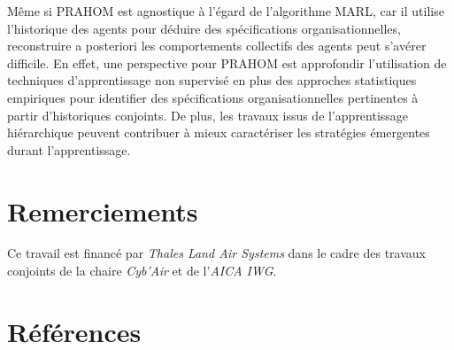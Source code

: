 \documentclass[contribution]{jfsma}
\begin{document}
Même si PRAHOM est agnostique à l'égard de l'algorithme MARL, car il utilise l'historique des agents pour déduire des spécifications organisationnelles, reconstruire a posteriori les comportements collectifs des agents peut s'avérer difficile. En effet, une perspective pour PRAHOM est approfondir l'utilisation de techniques d'apprentissage non supervisé en plus des approches statistiques empiriques pour identifier des spécifications organisationnelles pertinentes à partir d'historiques conjoints. De plus, les travaux issus de l’apprentissage hiérarchique peuvent contribuer à mieux caractériser les stratégies émergentes durant l’apprentissage.



\section*{Remerciements}

Ce travail est financé par \emph{Thales Land Air Systems} dans le cadre des travaux conjoints de la chaire \emph{Cyb'Air} et de l'\emph{AICA IWG}.

\section*{Références}
\small


\end{document}
